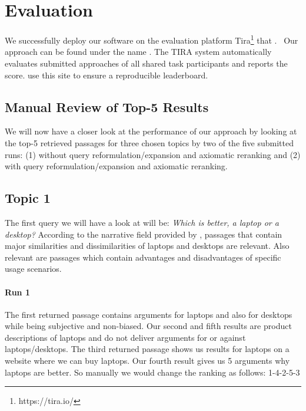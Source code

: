 \section{Evaluation}
\label{evaluation}

We successfully deploy our software on the evaluation platform Tira\footnote{https://tira.io/} that .~\todocite
Our approach can be found under the name .
The TIRA system automatically evaluates submitted approaches of all shared task participants and reports the  score.
\citet{BondarenkoFKSGBPBSWPH2022} use this site to ensure a reproducible leaderboard.

\subsection{Manual Review of Top-5 Results}

We will now have a closer look at the performance of our approach by looking at the top-5 retrieved passages for three chosen topics by two of the five submitted runs: 
(1) without query reformulation/expansion and axiomatic reranking and
(2) with query reformulation/expansion and axiomatic reranking.

\subsection{Topic 1}

The first query we will have a look at will be: \textit{Which is better, a laptop or a desktop?}
According to the narrative field provided by \citet{BondarenkoFKSGBPBSWPH2022}, passages that contain major similarities and dissimilarities of laptops and desktops are relevant.
Also relevant are passages which contain advantages and disadvantages of specific usage scenarios.

\paragraph{Run 1}

The first returned passage contains arguments for laptops and also for desktops while being subjective and non-biased.
Our second and fifth results are product descriptions of laptops and do not deliver arguments for or against laptops/desktops.
The third returned passage shows us results for laptops on a website where we can buy laptops.
Our fourth result gives us 5 arguments why laptops are better.
So manually we would  change the ranking as follows: 1-4-2-5-3

